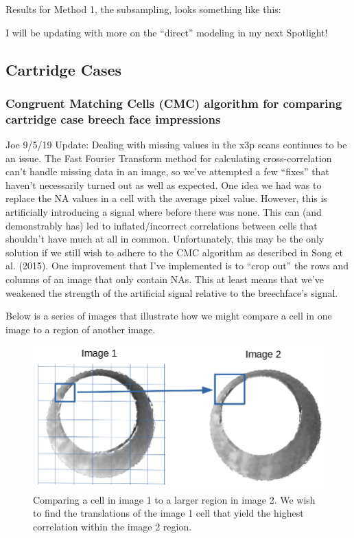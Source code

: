 \documentclass[]{book}
\begin{document}
Results for Method 1, the subsampling, looks something like this:

I will be updating with more on the ``direct'' modeling in my next Spotlight!

\hypertarget{cartridge-cases}{%
\subsection{Cartridge Cases}\label{cartridge-cases}}

\hypertarget{congruent-matching-cells-cmc-algorithm-for-comparing-cartridge-case-breech-face-impressions}{%
\subsubsection{Congruent Matching Cells (CMC) algorithm for comparing cartridge case breech face impressions}\label{congruent-matching-cells-cmc-algorithm-for-comparing-cartridge-case-breech-face-impressions}}

Joe 9/5/19 Update: Dealing with missing values in the x3p scans continues to be an issue. The Fast Fourier Transform method for calculating cross-correlation can't handle missing data in an image, so we've attempted a few ``fixes'' that haven't necessarily turned out as well as expected. One idea we had was to replace the NA values in a cell with the average pixel value. However, this is artificially introducing a signal where before there was none. This can (and demonstrably has) led to inflated/incorrect correlations between cells that shouldn't have much at all in common. Unfortunately, this may be the only solution if we still wish to adhere to the CMC algorithm as described in Song et al. (2015). One improvement that I've implemented is to ``crop out'' the rows and columns of an image that only contain NAs. This at least means that we've weakened the strength of the artificial signal relative to the breechface's signal.

Below is a series of images that illustrate how we might compare a cell in one image to a region of another image.

\begin{figure}

{\centering \includegraphics[width=0.5\linewidth]{images/cartridge_cases/im1_im2_cellComparison} 

}

\caption{Comparing a cell in image 1 to a larger region in image 2. We wish to find the translations of the image 1 cell that yield the highest correlation within the image 2 region.}\label{fig:unnamed-chunk-17}
\end{figure}
\end{document}
